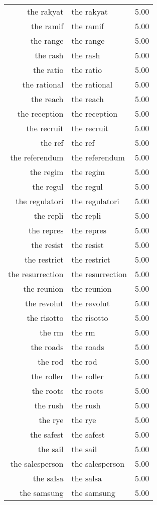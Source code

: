 \begin{table}[ht]
\begin{tabular}{rlr}
  the rakyat & the rakyat & 5.00 \\ 
  the ramif & the ramif & 5.00 \\ 
  the range & the range & 5.00 \\ 
  the rash & the rash & 5.00 \\ 
  the ratio & the ratio & 5.00 \\ 
  the rational & the rational & 5.00 \\ 
  the reach & the reach & 5.00 \\ 
  the reception & the reception & 5.00 \\ 
  the recruit & the recruit & 5.00 \\ 
  the ref & the ref & 5.00 \\ 
  the referendum & the referendum & 5.00 \\ 
  the regim & the regim & 5.00 \\ 
  the regul & the regul & 5.00 \\ 
  the regulatori & the regulatori & 5.00 \\ 
  the repli & the repli & 5.00 \\ 
  the repres & the repres & 5.00 \\ 
  the resist & the resist & 5.00 \\ 
  the restrict & the restrict & 5.00 \\ 
  the resurrection & the resurrection & 5.00 \\ 
  the reunion & the reunion & 5.00 \\ 
  the revolut & the revolut & 5.00 \\ 
  the risotto & the risotto & 5.00 \\ 
  the rm & the rm & 5.00 \\ 
  the roads & the roads & 5.00 \\ 
  the rod & the rod & 5.00 \\ 
  the roller & the roller & 5.00 \\ 
  the roots & the roots & 5.00 \\ 
  the rush & the rush & 5.00 \\ 
  the rye & the rye & 5.00 \\ 
  the safest & the safest & 5.00 \\ 
  the sail & the sail & 5.00 \\ 
  the salesperson & the salesperson & 5.00 \\ 
  the salsa & the salsa & 5.00 \\ 
  the samsung & the samsung & 5.00 \\ 

\end{tabular}
\end{table}
